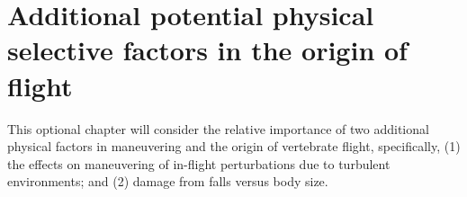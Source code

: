 %
%
%





\section{Additional potential physical selective factors in the origin of flight}
\label{sec:Chap4}
This optional chapter will consider the relative importance of two additional physical factors in maneuvering and the origin of vertebrate flight, specifically, (1) the effects on maneuvering of in-flight perturbations due to turbulent environments; and (2) damage from falls versus body size.

